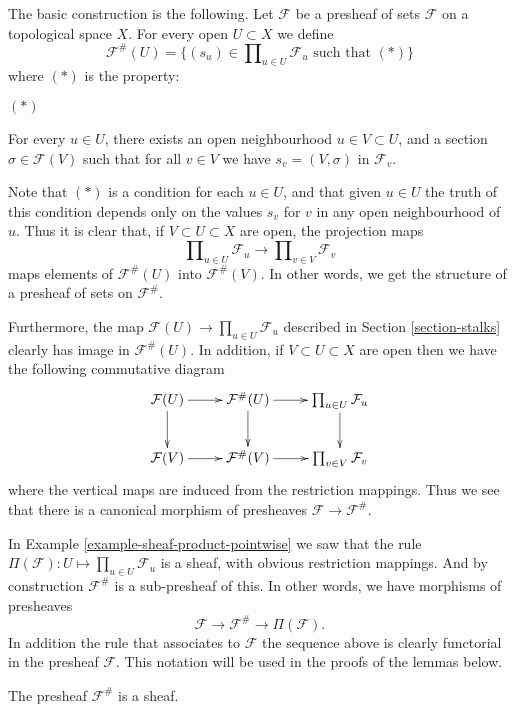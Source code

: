 \medskip\noindent
The basic construction is the following. Let $\mathcal{F}$ be a presheaf
of sets $\mathcal{F}$ on a topological space $X$.
For every open $U \subset X$ we define
$$
\mathcal{F}^{\#}(U)
=
\{
(s_u) \in \prod\nolimits_{u \in U} \mathcal{F}_u
\text{ such that }(*)
\}
$$
where $(*)$ is the property:
\begin{list}{$(*)$}{}
\item For every $u \in U$, there exists an open neighbourhood
$u \in V \subset U$, and a section $\sigma \in \mathcal{F}(V)$
such that for all $v \in V$ we have $s_v = (V, \sigma)$
in $\mathcal{F}_v$.
\end{list}
Note that $(*)$ is a condition for each $u \in U$,
and that given $u \in U$ the truth of this condition
depends only on the values $s_v$ for $v$ in any open neighbourhood
of $u$. Thus it is clear that,
if $V \subset U \subset X$ are open, the projection maps
$$
\prod\nolimits_{u \in U} \mathcal{F}_u
\longrightarrow
\prod\nolimits_{v \in V} \mathcal{F}_v
$$
maps elements of $\mathcal{F}^{\#}(U)$ into $\mathcal{F}^{\#}(V)$.
In other words, we get the structure of a presheaf of sets
on $\mathcal{F}^{\#}$. 

\medskip\noindent
Furthermore, the map $\mathcal{F}(U) \to \prod_{u \in U} \mathcal{F}_u$
described in Section \ref{section-stalks} clearly has image
in $\mathcal{F}^{\#}(U)$. In addition, if $V \subset U \subset X$ are
open then we have the following commutative diagram
$$
\xymatrix{
\mathcal{F}(U) \ar[r] \ar[d] &
\mathcal{F}^{\#}(U) \ar[r] \ar[d] &
\prod_{u\in U} \mathcal{F}_u \ar[d]\cr
\mathcal{F}(V) \ar[r] &
\mathcal{F}^{\#}(V) \ar[r] &
\prod_{v\in V} \mathcal{F}_v
}
$$
where the vertical maps are induced from the
restriction mappings. Thus we see that
there is a canonical morphism of presheaves
$\mathcal{F} \to \mathcal{F}^{\#}$.

\medskip\noindent
In Example \ref{example-sheaf-product-pointwise} we saw
that the rule $\Pi(\mathcal{F}) : U \mapsto \prod_{u\in U} \mathcal{F}_u$
is a sheaf, with obvious restriction mappings. And by construction
$\mathcal{F}^{\#}$ is a sub-presheaf of this. In other words, we
have morphisms of presheaves
$$
\mathcal{F} \to \mathcal{F}^\# \to \Pi(\mathcal{F}).
$$
In addition the rule that associates to $\mathcal{F}$
the sequence above is clearly functorial in the presheaf $\mathcal{F}$.
This notation will be
used in the proofs of the lemmas below.

\begin{lemma}
\label{lemma-sheafification-sheaf}
The presheaf $\mathcal{F}^{\#}$ is a sheaf.
\end{lemma}


